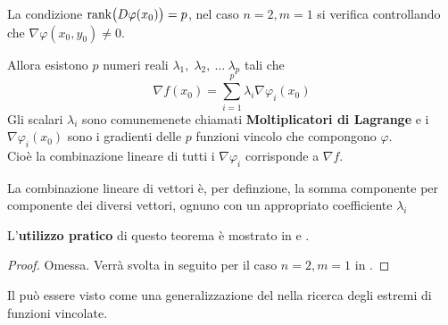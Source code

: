 \begin{theorem}
\begin{note}
	\end{note}
	\begin{note}
		La condizione $\operatorname{rank} \bigl( D\varphi(x_0) \bigr) = p$, nel caso $n = 2, m = 1$ si verifica controllando che $\nabla \varphi (x_0, y_0) \neq 0$.
	\end{note}
	Allora esistono $p$ numeri reali $\lambda_1,\; \lambda_2,\:\dotsc\:\lambda_p$ tali che
	\begin{equation}
		\label{eq:eqiv_nabl_molt_lagr}
		\nabla f(x_0) = \sum\limits_{i = 1}^{p} \lambda_i \nabla \varphi_i (x_0)
	\end{equation}
	Gli scalari $\lambda_i$ sono comunemenete chiamati \textbf{Moltiplicatori di Lagrange} e i $\nabla \varphi_i (x_0)$ sono i gradienti delle $p$ funzioni vincolo che compongono $\varphi$.\\
	Cioè la combinazione lineare di tutti i $\nabla \varphi_i$ corrisponde a $\nabla f$.
	\begin{note}
		La combinazione lineare di vettori è, per definzione, la somma componente per componente dei diversi vettori, ognuno con un appropriato coefficiente $\lambda_i$
	\end{note}
	\begin{note}
		L'\textbf{utilizzo pratico} di questo teorema è mostrato in  e .
	\end{note}
	\begin{proof}
		Omessa. Verrà svolta in seguito per il caso $n = 2, m = 1$ in .
	\end{proof}
\end{theorem}
\begin{observation}
	Il  può essere visto come una generalizzazione del  nella ricerca degli estremi di funzioni vincolate.
\end{observation}

